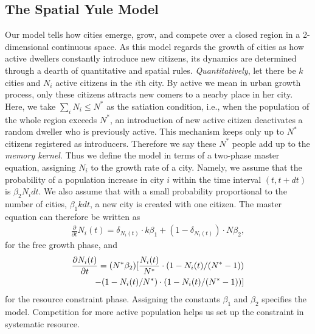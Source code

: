 \documentclass[reprint,unsortedaddress,amsmath,amssymb,aps,prl,showkeys]{revtex4-2}
\begin{document}
\subsection{The Spatial Yule Model}
Our model tells how cities emerge, grow, and compete over a closed region in a 2-dimensional continuous space. As this model regards the growth of cities as how active dwellers constantly introduce new citizens, its dynamics are determined through a dearth of quantitative and spatial rules. \emph{Quantitatively}, let there be $k$ cities and $N_i$ active citizens in the $i$th city. By active we mean in urban growth process, only these citizens attracts new comers to a nearby place in her city. Here, we take $\sum_{i} N_i \le N^*$ as the satiation condition, i.e., when the population of the whole region exceeds $N^*$, an introduction of new active citizen deactivates a random dweller who is previously active. This mechanism keeps only up to $N^*$ citizens registered as introducers. Therefore we say these $N^*$ people add up to the \emph{memory kernel}. Thus we define the model in terms of a two-phase master equation, assigning $N_i$ to the growth rate of a city. Namely, we assume that the probability of a population increase in city $i$ within the time interval $(t,t+dt)$ is $\beta_2N_idt$. We also assume that with a small probability proportional to the number of cities, $\beta_1kdt$, a new city is created with one citizen. The master equation can therefore be written as \begin{align}\frac{\partial}{\partial t}N_i(t) =  \delta_{N_i(t)}\cdot k\beta_1+ (1-\delta_{N_i(t)})\cdot N\beta_2, \end{align} for the free growth phase, and \begin{align}
	\frac{\partial N_i(t)}{\partial t}  = (N^*\beta_2)[\frac{N_i(t)}{N^*}\cdot(1-N_i(t)/(N^*-1))& \notag\\  - (1-N_i(t)/N^*)\cdot (1-N_i(t)/(N^*-1)) ]&
\end{align}
for the resource constraint phase. Assigning the constants $\beta_1$ and $\beta_2$ specifies the model. Competition for more active population helps us set up the constraint in systematic resource. 
\end{document}
